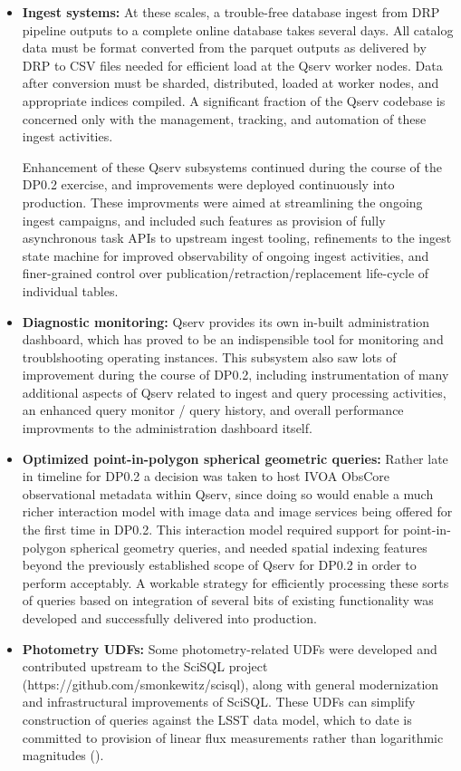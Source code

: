 \begin{itemize}

\item
  \textbf{Ingest systems:} At these scales, a trouble-free database ingest from DRP pipeline outputs to a
  complete online database takes several days.  All catalog data must be format converted from the parquet
  outputs as delivered by DRP to CSV files needed for efficient load at the Qserv worker nodes.  Data after
  conversion must be sharded, distributed, loaded at worker nodes, and appropriate indices compiled.  A
  significant fraction of the Qserv codebase is concerned only with the management, tracking, and automation
  of these ingest activities.

  Enhancement of these Qserv subsystems continued during the course of the DP0.2 exercise, and improvements
  were deployed continuously into production.  These improvments were aimed at streamlining the ongoing ingest
  campaigns, and included such features as provision of fully asynchronous task APIs to upstream ingest
  tooling, refinements to the ingest state machine for improved observability of ongoing ingest activities,
  and finer-grained control over publication/retraction/replacement life-cycle of individual tables.

\item
  \textbf{Diagnostic monitoring:} Qserv provides its own in-built administration dashboard, which has proved
  to be an indispensible tool for monitoring and troublshooting operating instances.  This subsystem also saw
  lots of improvement during the course of DP0.2, including instrumentation of many additional aspects of
  Qserv related to ingest and query processing activities, an enhanced query monitor / query history, and
  overall performance improvments to the administration dashboard itself.

\item
  \textbf{Optimized point-in-polygon spherical geometric queries:} Rather late in timeline for DP0.2 a
  decision was taken to host IVOA ObsCore observational metadata within Qserv, since doing so would enable a
  much richer interaction model with image data and image services being offered for the first time in DP0.2.
  This interaction model required support for point-in-polygon spherical geometry queries, and needed spatial
  indexing features beyond the previously established scope of Qserv for DP0.2 in order to perform acceptably.
  A workable strategy for efficiently processing these sorts of queries based on integration of several bits
  of existing functionality was developed and successfully delivered into production.

\item
  \textbf{Photometry UDFs:} Some photometry-related UDFs were developed and contributed upstream to the SciSQL
  project (https://github.com/smonkewitz/scisql), along with general modernization and infrastructural
  improvements of SciSQL.  These UDFs can simplify construction of queries against the LSST data model, which
  to date is committed to provision of linear flux measurements rather than logarithmic magnitudes
  ().

\end{itemize}

